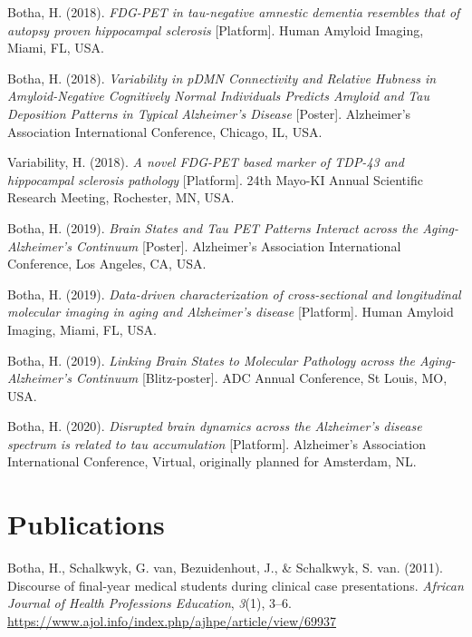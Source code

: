 \documentclass[11pt, a4paper]{awesome-cv}
\begin{document}
\leavevmode\hypertarget{ref-Botha_HAI_2018}{}%
Botha, H. (2018). \emph{{FDG-PET in tau-negative amnestic dementia
resembles that of autopsy proven hippocampal sclerosis}} {[}Platform{]}.
{Human Amyloid Imaging}, Miami, {FL}, {USA}.

\leavevmode\hypertarget{ref-Botha_AIC_2018}{}%
Botha, H. (2018). \emph{{Variability in pDMN Connectivity and Relative
Hubness in Amyloid-Negative Cognitively Normal Individuals Predicts
Amyloid and Tau Deposition Patterns in Typical Alzheimer's Disease}}
{[}Poster{]}. {Alzheimer's Association International Conference},
Chicago, {IL}, {USA}.

\leavevmode\hypertarget{ref-Botha_KI_2018}{}%
Variability, H. (2018). \emph{{A novel FDG-PET based marker of TDP-43
and hippocampal sclerosis pathology}} {[}Platform{]}. {24th Mayo-KI
Annual Scientific Research Meeting}, Rochester, {MN}, {USA}.

\leavevmode\hypertarget{ref-Botha_AIC_2019}{}%
Botha, H. (2019). \emph{{Brain States and Tau PET Patterns Interact
across the Aging-Alzheimer's Continuum}} {[}Poster{]}. {Alzheimer's
Association International Conference}, Los Angeles, {CA}, {USA}.

\leavevmode\hypertarget{ref-Botha_HAI_2019}{}%
Botha, H. (2019). \emph{{Data-driven characterization of cross-sectional
and longitudinal molecular imaging in aging and Alzheimer's disease}}
{[}Platform{]}. {Human Amyloid Imaging}, Miami, {FL}, {USA}.

\leavevmode\hypertarget{ref-Botha_ADRD_2019}{}%
Botha, H. (2019). \emph{{Linking Brain States to Molecular Pathology
across the Aging-Alzheimer's Continuum}} {[}Blitz-poster{]}. {ADC Annual
Conference}, St Louis, {MO}, {USA}.

\leavevmode\hypertarget{ref-Botha_AAIC_2020}{}%
Botha, H. (2020). \emph{{Disrupted brain dynamics across the Alzheimer's
disease spectrum is related to tau accumulation}} {[}Platform{]}.
{Alzheimer's Association International Conference}, Virtual, originally
planned for Amsterdam, {NL}.

\endgroup

\hypertarget{publications}{%
\section{Publications}\label{publications}}

\begingroup
\setlength{\parindent}{-0in}
\setlength{\leftskip}{0in}
\setlength{\rightskip}{0.1in}
\footnotesize

\hypertarget{refs_published}{}
\leavevmode\hypertarget{ref-botha_discourse_2011}{}%
Botha, H., Schalkwyk, G. van, Bezuidenhout, J., \& Schalkwyk, S. van.
(2011). Discourse of final-year medical students during clinical case
presentations. \emph{African Journal of Health Professions Education},
\emph{3}(1), 3--6.
\url{https://www.ajol.info/index.php/ajhpe/article/view/69937}
\end{document}
